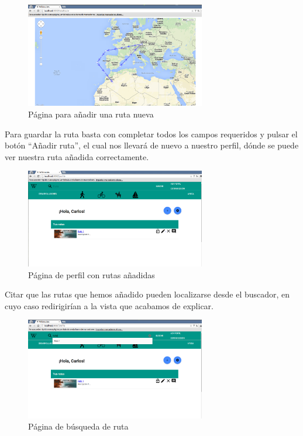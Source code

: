 \documentclass[11pt,a4paper]{article}
\begin{document}
\begin{figure}[h]
\centering
  \includegraphics[width=0.7\textwidth]{./imagenes/anadir}
  \caption{Página para añadir una ruta nueva}
  \label{fig: Página para añadir una ruta nueva}
\end{figure}

Para guardar la ruta basta con completar todos los campos requeridos y pulsar el botón ``Añadir ruta'', el cual nos llevará de nuevo a nuestro perfil, dónde se puede ver nuestra ruta añadida correctamente.\\
\clearpage
\begin{figure}[h]
\centering
  \includegraphics[width=0.7\textwidth]{./imagenes/perfilanadir}
  \caption{Página de perfil con rutas añadidas}
  \label{fig: Página de perfil con rutas añadidas}
\end{figure}

Citar que las rutas que hemos añadido pueden localizarse desde el buscador, en cuyo caso redirigirían a la vista que acabamos de explicar.\\

\begin{figure}[h]
\centering
  \includegraphics[width=0.7\textwidth]{./imagenes/buscar}
  \caption{Página de búsqueda de ruta}
  \label{fig: Página de búsqueda de ruta}
\end{figure}
\end{document}
